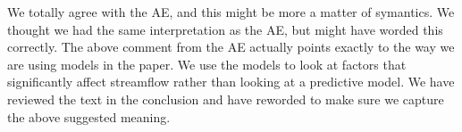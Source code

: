\documentclass[]{elsarticle} %
\begin{document}
We totally agree with the AE, and this might be more a matter of symantics. We thought we had the same interpretation as the AE, but might have worded this correctly. The above comment from the AE actually points exactly to the way we are using models in the paper. We use the models to look at factors that significantly affect streamflow rather than looking at a predictive model.
We have reviewed the text in the conclusion and have reworded to make sure we capture the above suggested meaning.


\end{document}
